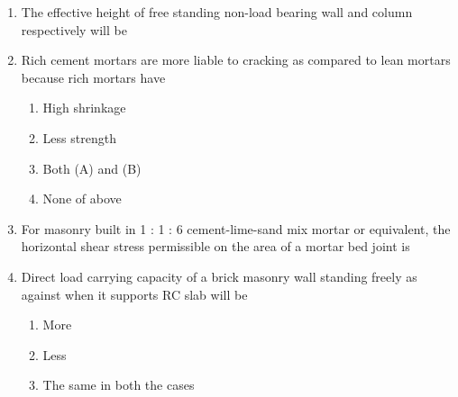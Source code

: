 \documentclass[11pt,a4paper]{article}
\begin{document}
\begin{enumerate}
{(ii) Will result in reduction of stresses due to differential expansion of masonry units.}
\begin{enumerate}[label=\Alph*.]
\item{(i) alone is correct}
\item{(ii) alone is correct}
\item{Both (i) and (ii) are correct}
\item{Neither (i) nor (ii) is correct}
\end{enumerate}
\item{The effective height of free standing non-load bearing wall and column respectively will be}
\\
\item{Rich cement mortars are more liable to cracking as compared to lean mortars because rich mortars have}
\begin{enumerate}[label=\Alph*.]
\item{High shrinkage}
\item{Less strength}
\item{Both (A) and (B)}
\item{None of above}
\end{enumerate}
\item{For masonry built in 1 : 1 : 6 cement-lime-sand mix mortar or equivalent, the horizontal shear stress permissible on the area of a mortar bed joint is}
\\
\item{Direct load carrying capacity of a brick masonry wall standing freely as against when it supports RC slab will be}
\begin{enumerate}[label=\Alph*.]
\item{More}
\item{Less}
\item{The same in both the cases}

\end{enumerate}
\end{enumerate}
\end{document}
